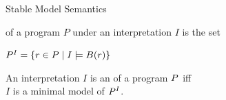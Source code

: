 \documentclass[trans,draft]{beamer} %
\begin{document}
\begin{frame}{Stable Model Semantics}
	\onslide<+->
	
	\begin{definition}
		 of a program $P$ under an interpretation $I$ is the set
		\begin{center}
			${P}^{I} = \{r \in P \mid I \models B\mathrm{(}{r}\mathrm{)}\}$
		\end{center}
	\end{definition}
	
	\begin{definition}
		An interpretation $I$ is an  of a program $P$ iff\\
		$I$ is a minimal model of ${P}^{I}$.
	\end{definition}
	
\end{frame}
\end{document}
